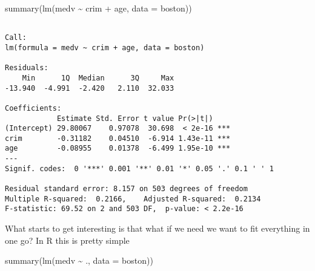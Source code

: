 \documentclass[
  letterpaper,
  DIV=11,
  numbers=noendperiod]{scrreprt}
\newenvironment{Shaded}{\begin{snugshade}}{\end{snugshade}}
\newcommand{\AttributeTok}[1]{\textcolor[rgb]{0.40,0.45,0.13}{#1}}
\newcommand{\FunctionTok}[1]{\textcolor[rgb]{0.28,0.35,0.67}{#1}}
\newcommand{\NormalTok}[1]{\textcolor[rgb]{0.00,0.23,0.31}{#1}}
\newcommand{\SpecialCharTok}[1]{\textcolor[rgb]{0.37,0.37,0.37}{#1}}
\begin{document}
\begin{Shaded}
\begin{Highlighting}[]
\FunctionTok{summary}\NormalTok{(}\FunctionTok{lm}\NormalTok{(medv }\SpecialCharTok{\textasciitilde{}}\NormalTok{ crim }\SpecialCharTok{+}\NormalTok{ age, }\AttributeTok{data =}\NormalTok{ boston))}
\end{Highlighting}
\end{Shaded}

\begin{verbatim}

Call:
lm(formula = medv ~ crim + age, data = boston)

Residuals:
    Min      1Q  Median      3Q     Max 
-13.940  -4.991  -2.420   2.110  32.033 

Coefficients:
            Estimate Std. Error t value Pr(>|t|)    
(Intercept) 29.80067    0.97078  30.698  < 2e-16 ***
crim        -0.31182    0.04510  -6.914 1.43e-11 ***
age         -0.08955    0.01378  -6.499 1.95e-10 ***
---
Signif. codes:  0 '***' 0.001 '**' 0.01 '*' 0.05 '.' 0.1 ' ' 1

Residual standard error: 8.157 on 503 degrees of freedom
Multiple R-squared:  0.2166,    Adjusted R-squared:  0.2134 
F-statistic: 69.52 on 2 and 503 DF,  p-value: < 2.2e-16
\end{verbatim}

What starts to get interesting is that what if we need we want to fit
everything in one go? In R this is pretty simple

\begin{Shaded}
\begin{Highlighting}[]
\FunctionTok{summary}\NormalTok{(}\FunctionTok{lm}\NormalTok{(medv }\SpecialCharTok{\textasciitilde{}}\NormalTok{ ., }\AttributeTok{data =}\NormalTok{ boston))}
\end{Highlighting}
\end{Shaded}
\end{document}
